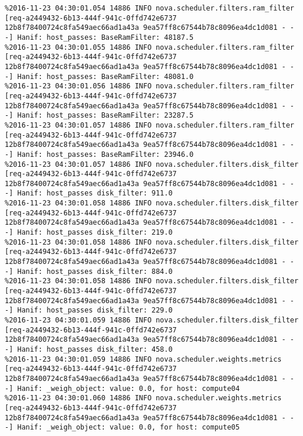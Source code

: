\begin{lstlisting}[frame=single, caption={The filter scheduler log trace for 10 virtual instances}, label={lst:filterschedulercodetracelog10vi}, escapechar=|]
%2016-11-23 04:30:01.053 14886 INFO nova.scheduler.filters.ram_filter [req-a2449432-6b13-444f-941c-0ffd742e6737 12b8f78400724c8fa549aec66ad1a43a 9ea57ff8c67544b78c8096ea4dc1d081 - - -] Hanif: host_passes: BaseRamFilter: 11598.0
%2016-11-23 04:30:01.054 14886 INFO nova.scheduler.filters.ram_filter [req-a2449432-6b13-444f-941c-0ffd742e6737 12b8f78400724c8fa549aec66ad1a43a 9ea57ff8c67544b78c8096ea4dc1d081 - - -] Hanif: host_passes: BaseRamFilter: 48187.5
%2016-11-23 04:30:01.055 14886 INFO nova.scheduler.filters.ram_filter [req-a2449432-6b13-444f-941c-0ffd742e6737 12b8f78400724c8fa549aec66ad1a43a 9ea57ff8c67544b78c8096ea4dc1d081 - - -] Hanif: host_passes: BaseRamFilter: 48081.0
%2016-11-23 04:30:01.056 14886 INFO nova.scheduler.filters.ram_filter [req-a2449432-6b13-444f-941c-0ffd742e6737 12b8f78400724c8fa549aec66ad1a43a 9ea57ff8c67544b78c8096ea4dc1d081 - - -] Hanif: host_passes: BaseRamFilter: 23287.5
%2016-11-23 04:30:01.057 14886 INFO nova.scheduler.filters.ram_filter [req-a2449432-6b13-444f-941c-0ffd742e6737 12b8f78400724c8fa549aec66ad1a43a 9ea57ff8c67544b78c8096ea4dc1d081 - - -] Hanif: host_passes: BaseRamFilter: 23946.0
%2016-11-23 04:30:01.057 14886 INFO nova.scheduler.filters.disk_filter [req-a2449432-6b13-444f-941c-0ffd742e6737 12b8f78400724c8fa549aec66ad1a43a 9ea57ff8c67544b78c8096ea4dc1d081 - - -] Hanif: host_passes disk_filter: 911.0
%2016-11-23 04:30:01.058 14886 INFO nova.scheduler.filters.disk_filter [req-a2449432-6b13-444f-941c-0ffd742e6737 12b8f78400724c8fa549aec66ad1a43a 9ea57ff8c67544b78c8096ea4dc1d081 - - -] Hanif: host_passes disk_filter: 219.0
%2016-11-23 04:30:01.058 14886 INFO nova.scheduler.filters.disk_filter [req-a2449432-6b13-444f-941c-0ffd742e6737 12b8f78400724c8fa549aec66ad1a43a 9ea57ff8c67544b78c8096ea4dc1d081 - - -] Hanif: host_passes disk_filter: 884.0
%2016-11-23 04:30:01.058 14886 INFO nova.scheduler.filters.disk_filter [req-a2449432-6b13-444f-941c-0ffd742e6737 12b8f78400724c8fa549aec66ad1a43a 9ea57ff8c67544b78c8096ea4dc1d081 - - -] Hanif: host_passes disk_filter: 229.0
%2016-11-23 04:30:01.059 14886 INFO nova.scheduler.filters.disk_filter [req-a2449432-6b13-444f-941c-0ffd742e6737 12b8f78400724c8fa549aec66ad1a43a 9ea57ff8c67544b78c8096ea4dc1d081 - - -] Hanif: host_passes disk_filter: 458.0
%2016-11-23 04:30:01.059 14886 INFO nova.scheduler.weights.metrics [req-a2449432-6b13-444f-941c-0ffd742e6737 12b8f78400724c8fa549aec66ad1a43a 9ea57ff8c67544b78c8096ea4dc1d081 - - -] Hanif: _weigh_object: value: 0.0, for host: compute04
%2016-11-23 04:30:01.060 14886 INFO nova.scheduler.weights.metrics [req-a2449432-6b13-444f-941c-0ffd742e6737 12b8f78400724c8fa549aec66ad1a43a 9ea57ff8c67544b78c8096ea4dc1d081 - - -] Hanif: _weigh_object: value: 0.0, for host: compute05

\end{lstlisting}
